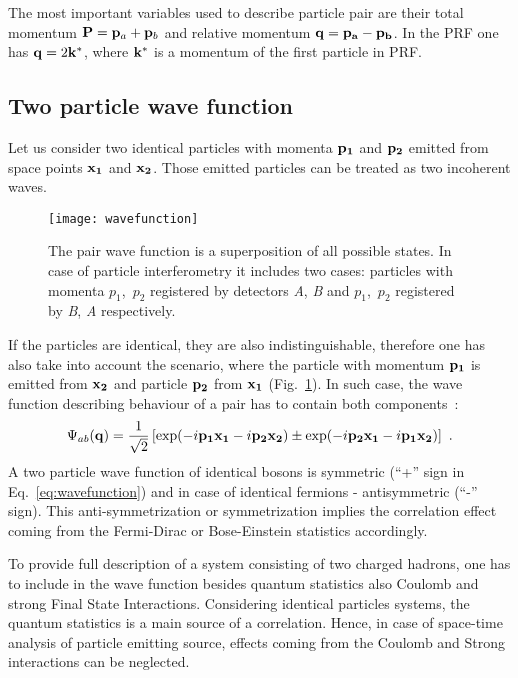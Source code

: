       The most important variables used to describe particle pair are their total momentum $\mathbf{P} = \mathbf{p}_a + \mathbf{p}_b$ and relative momentum $\mathbf{q} = \mathbf{p_a} - \mathbf{p_b}$.
      In the PRF one has $\mathbf{q} = 2 \mathbf{k}^{*}$, where $\mathbf{k}^{*}$ is a momentum of the first particle in PRF.

    \subsection{Two particle wave function}
      Let us consider two identical particles with momenta $\mathbf{p_1}$ and $\mathbf{p_2}$ emitted from space points $\mathbf{x_1}$ and $\mathbf{x_2}$.
      Those emitted particles can be treated as two incoherent waves.
      \begin{figure}[h]
        \centering
        \texttt{[image: wavefunction]}
        \caption{The pair wave function is a superposition of all possible states. In case of particle interferometry it includes two cases: particles with momenta $p_1$,~$p_2$ registered by detectors \textit{A}, \textit{B} and $p_1$,~$p_2$ registered by \textit{B}, \textit{A} respectively.}
        \label{fig:wavefunction}
      \end{figure}
      If the particles are identical, they are also indistinguishable, therefore one has also take into account the scenario, where the particle with momentum $\mathbf{p_1}$ is emitted from $\mathbf{x_2}$ and particle $\mathbf{p_2}$ from $\mathbf{x_1}$ (Fig.~\ref{fig:wavefunction}).
      In such case, the wave function describing behaviour of a pair has to contain both components~\cite{drkisiel}:
      \begin{equation}
      \label{eq:wavefunction}
        \Psi_{ab}(\mathbf{q})=\frac{1}{\sqrt{2}} \left[ \exp(- i \mathbf{p_1}\mathbf{x_1} - i \mathbf{p_2}\mathbf{x_2}) \pm \exp(- i \mathbf{p_2}\mathbf{x_1} - i \mathbf{p_1}\mathbf{x_2}) \right]~.
      \end{equation}
      A two particle wave function of identical bosons is symmetric (``+'' sign in Eq.~\ref{eq:wavefunction}) and in case of identical fermions - antisymmetric (``-'' sign).
      This anti-symmetrization or symmetrization implies the correlation effect coming from the Fermi-Dirac or Bose-Einstein statistics accordingly.

      To provide full description of a system consisting of two charged hadrons, one has to include in the wave function besides quantum statistics also Coulomb and strong Final State Interactions.
      Considering identical particles systems, the quantum statistics is a main source of a correlation.
      Hence, in case of space-time analysis of particle emitting source, effects coming from the Coulomb and Strong interactions can be neglected.
